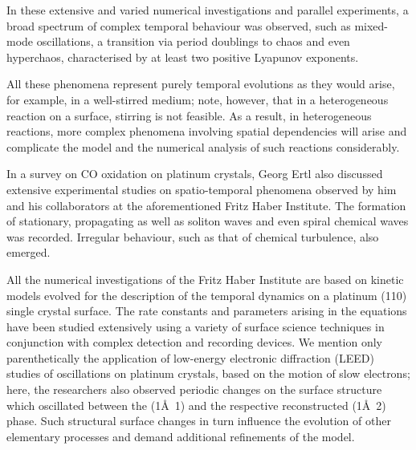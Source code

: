 \documentclass[12pt]{article}
\begin{document}
\hfill

In these extensive and varied numerical investigations and parallel experiments, a
broad spectrum of complex temporal behaviour was observed, such as mixed-mode
oscillations, a transition via period doublings to chaos and even hyperchaos, characterised
by at least two positive Lyapunov exponents.

\hfill

All these phenomena represent purely temporal evolutions as they would arise, for
example, in a well-stirred medium; note, however, that in a heterogeneous reaction
on a surface, stirring is not feasible. As a result, in heterogeneous reactions, more
complex phenomena involving spatial dependencies will arise and complicate the
model and the numerical analysis of such reactions considerably.

\hfill

In a survey on CO oxidation on platinum crystals, Georg Ertl also discussed extensive
experimental studies on spatio-temporal phenomena observed by him and his
collaborators at the aforementioned Fritz Haber Institute. The formation of stationary,
propagating as well as soliton waves and even spiral chemical waves was
recorded. Irregular behaviour, such as that of chemical turbulence, also emerged.

\hfill

All the numerical investigations of the Fritz Haber Institute are based on kinetic
models evolved for the description of the temporal dynamics on a platinum (110)
single crystal surface. The rate constants and parameters arising in the equations
have been studied extensively using a variety of surface science techniques in conjunction
with complex detection and recording devices. We mention only parenthetically
the application of low-energy electronic diffraction (LEED) studies of
oscillations on platinum crystals, based on the motion of slow electrons; here, the
researchers also observed periodic changes on the surface structure which oscillated
between the (1Å~1) and the respective reconstructed (1Å~2) phase. Such structural
surface changes in turn influence the evolution of other elementary processes and
demand additional refinements of the model.

\hfill
\end{document}
